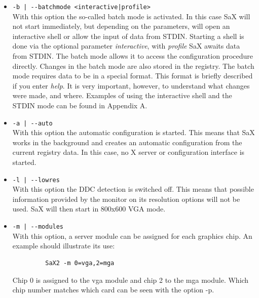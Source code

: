 \begin{itemize}
\item \verb+-b | --batchmode <interactive|profile>+\\
      With this option the so-called batch mode is activated.
      In this case SaX will not start immediately, but depending on the
      parameters, will open an interactive shell or allow the input of data
      from STDIN. Starting a shell is done via the optional parameter 
      \textit{interactive}, with \textit{profile} SaX awaits data from STDIN. 
      The batch mode allows it to access the configuration procedure directly. 
      Changes in the batch mode are also stored in the registry.
      The batch mode requires data to be in a special format. This format is
      briefly described if you enter \textit{help}. It is very important,
      however, to understand what changes were made, and where. Examples of
      using the interactive shell and the STDIN mode can be found in Appendix
      A. 
      
\item \verb+-a | --auto+\\
      With this option the automatic configuration is started. This means that
      SaX works in the background and creates an automatic configuration from
      the current registry data. In this case, no X server or  
      configuration interface is started. 

\item \verb+-l | --lowres+\\
      With this option the DDC detection is switched off. This means that
      possible information provided by the monitor on its resolution options
      will not be used. SaX will then start in 800x600 VGA mode.

\item \verb+-m | --modules+\\
      With this option, a server module can be assigned for each graphics
      chip. An example should illustrate its use:
      \begin{verbatim}
         SaX2 -m 0=vga,2=mga 
      \end{verbatim}
      Chip 0 is assigned to the vga module and chip 2 to the mga module. Which
      chip number matches which card can be seen with the option -p. 
      

\end{itemize}
